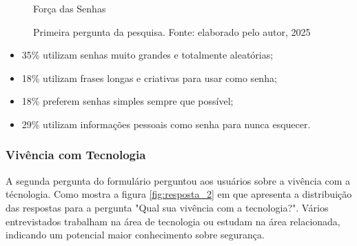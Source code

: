\documentclass[12pt]{article}
\begin{document}
\begin{figure}[!htbp]
  \centering
  \caption*{\normalfont Força das Senhas}
  \caption{Primeira pergunta da pesquisa. Fonte: elaborado pelo autor, 2025}
  \label{fig:resposta_1}
\end{figure}

\FloatBarrier
\begin{itemize}
  \item 35\% utilizam senhas muito grandes e totalmente aleatórias;
  \item 18\% utilizam frases longas e criativas para usar como senha;
  \item 18\% preferem senhas simples sempre que possível;
  \item 29\% utilizam informações pessoais como senha para nunca esquecer.
\end{itemize}

\subsubsection{Vivência com Tecnologia}

A segunda pergunta do formulário perguntou aos usuários sobre a vivência com a técnologia.
Como mostra a figura \ref{fig:resposta_2} em que apresenta a distribuição das
respostas para a pergunta "Qual sua vivência com a tecnologia?".
Vários entrevistados trabalham na área de tecnologia ou estudam na área relacionada,
indicando um potencial maior conhecimento sobre segurança.
\end{document}
